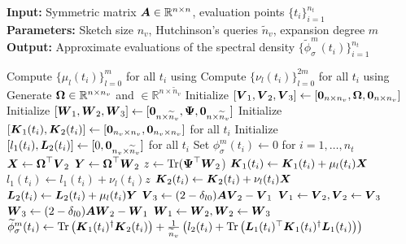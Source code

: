 \hspace*{\algorithmicindent} \textbf{Input:} Symmetric matrix $\boldsymbol{A} \in \mathbb{R}^{n \times n}$, evaluation points $\{t_i\}_{i=1}^{n_t}$ \\
\hspace*{\algorithmicindent} \textbf{Parameters:} Sketch size $n_v$, Hutchinson's queries $\widetilde{n}_v$, expansion degree $m$ \\
\hspace*{\algorithmicindent} \textbf{Output:} Approximate evaluations of the spectral density $\{\widetilde{\phi}_{\sigma}^m(t_i)\}_{i=1}^{n_t}$
\begin{algorithmic}[1]
    \State Compute $\{\mu_l(t_i)\}_{l=0}^m$ for all $t_i$ using 
    \State Compute $\{\nu_l(t_i)\}_{l=0}^{2m}$ for all $t_i$ using 
    \State Generate  $\boldsymbol{\boldsymbol{\Omega}} \in \mathbb{R}^{n \times n_v}$ and  $\in \mathbb{R}^{n \times \widetilde{n}_v}$
    \State Initialize $[\boldsymbol{V}_1, \boldsymbol{V}_2, \boldsymbol{V}_3] \gets [\boldsymbol{0}_{n \times n_v}, \boldsymbol{\boldsymbol{\Omega}}, \boldsymbol{0}_{n \times n_v}]$
    \State Initialize $[\boldsymbol{W}_1, \boldsymbol{W}_2, \boldsymbol{W}_3] \gets [\boldsymbol{0}_{n \times \widetilde{n}_v}, \boldsymbol{\Psi}, \boldsymbol{0}_{n \times \widetilde{n}_v}]$
    \State Initialize $[\boldsymbol{K}_1(t_i), \boldsymbol{K}_2(t_i)] \gets [\boldsymbol{0}_{n_v \times n_v}, \boldsymbol{0}_{n_v \times n_v}]$ for all $t_i$
    \State Initialize $[l_1(t_i), \boldsymbol{L}_2(t_i)] \gets [0, \boldsymbol{0}_{n_v \times \widetilde{n}_v}]$ for all $t_i$
    \State Set ${\phi}_{\sigma}^m(t_i) \gets 0$ for $i=1,\dots,n_t$
      \State $\boldsymbol{X} \gets \boldsymbol{\boldsymbol{\Omega}}^{\top} \boldsymbol{V}_2$
      \State $\boldsymbol{Y} \gets \boldsymbol{\boldsymbol{\Omega}}^{\top} \boldsymbol{W}_2$
      \State $z \gets \operatorname{Tr}(\boldsymbol{\Psi}^{\top} \boldsymbol{W}_2$)
            \State $\boldsymbol{K}_1(t_i) \gets \boldsymbol{K}_1(t_i) + \mu_l(t_i) \boldsymbol{X}$
            \State $l_1(t_i) \gets l_1(t_i) + \nu_l(t_i) z$
        \EndIf
        \State $\boldsymbol{K}_2(t_i) \gets \boldsymbol{K}_2(t_i) + \nu_l(t_i) \boldsymbol{X}$
        \State $\boldsymbol{L}_2(t_i) \gets \boldsymbol{L}_2(t_i) + \mu_l(t_i) \boldsymbol{Y}$
      \EndFor
      \State $\boldsymbol{V}_3 \gets (2 - \delta_{l0}) \boldsymbol{A} \boldsymbol{V}_2 - \boldsymbol{V}_1$ 
      \State $\boldsymbol{V}_1 \gets \boldsymbol{V}_2, \boldsymbol{V}_2 \gets \boldsymbol{V}_3$
      \State $\boldsymbol{W}_3 \gets (2 - \delta_{l0}) \boldsymbol{A} \boldsymbol{W}_2 - \boldsymbol{W}_1$ 
      \State $\boldsymbol{W}_1 \gets \boldsymbol{W}_2, \boldsymbol{W}_2 \gets \boldsymbol{W}_3$
    \EndFor
      \State $\widetilde{\phi}_{\sigma}^m(t_i) \gets \operatorname{Tr}\left( \boldsymbol{K}_1(t_i)^{\dagger}\boldsymbol{K}_2(t_i) \right) + \frac{1}{\widetilde{n}_v} \left( l_2(t_i) + \operatorname{Tr}\left( \boldsymbol{L}_1(t_i)^{\top} \boldsymbol{K}_1(t_i)^{\dagger} \boldsymbol{L}_1(t_i) \right)  \right) $
    \EndFor
\end{algorithmic}

